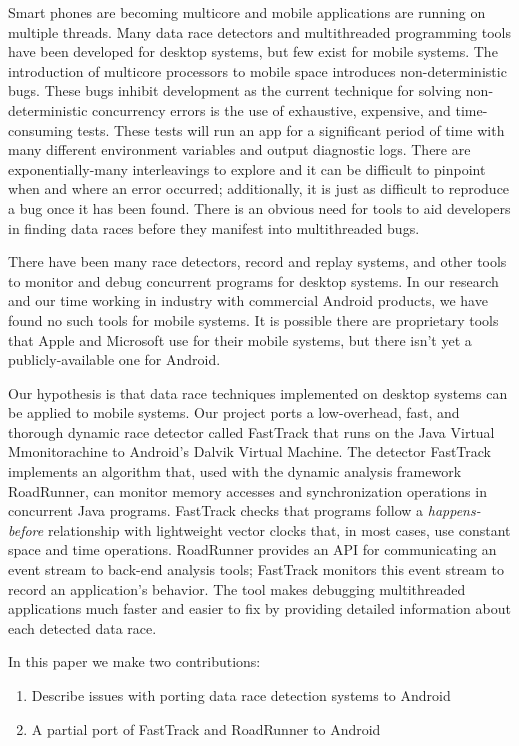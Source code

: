 \documentclass{acm_proc_article-sp}
\begin{document}
Smart phones are becoming multicore and mobile applications are running  on multiple threads. Many data race detectors and multithreaded programming tools have been developed for desktop systems, but few exist for mobile systems. The introduction of multicore processors to mobile space introduces non-deterministic bugs. These bugs inhibit development as the current technique for solving non-deterministic concurrency errors is the use of exhaustive, expensive, and time-consuming tests. These tests will run an app for a significant period of time with many different environment variables and output diagnostic logs. There are exponentially-many interleavings to explore and it can be difficult to pinpoint when and where an error occurred; additionally, it is just as difficult to reproduce a bug once it has been found. There is an obvious need for tools to aid developers in finding data races before they manifest into multithreaded bugs.

There have been many race detectors, record and replay systems, and other tools to monitor and debug concurrent programs for desktop systems. In our research and our time working in industry with commercial Android products, we have found no such tools for mobile systems. It is possible there are proprietary tools that Apple and Microsoft use for their mobile systems, but there isn't yet a publicly-available one for Android.
 
Our hypothesis is that data race techniques implemented on desktop systems can be applied to mobile systems. Our project ports a low-overhead, fast, and thorough dynamic race detector called FastTrack that runs on the Java Virtual Mmonitorachine to Android's Dalvik Virtual Machine. The detector FastTrack \cite{Flanagan2009} implements an algorithm that, used with the dynamic analysis framework RoadRunner, can monitor memory accesses and synchronization operations in concurrent Java programs. FastTrack checks that programs follow a \emph{happens-before} relationship\cite{Flanagan2010} with lightweight vector clocks that, in most cases, use constant space and time operations. RoadRunner provides an API for communicating an event stream to back-end analysis tools; FastTrack monitors this event stream to record an application's behavior. The tool makes debugging multithreaded applications much faster and easier to fix by providing detailed information about each detected data race.
 
In this paper we make two contributions:
\begin{enumerate}
\item Describe issues with porting data race detection systems to Android
\item A partial port of FastTrack and RoadRunner to Android
\end{enumerate}
\end{document}
